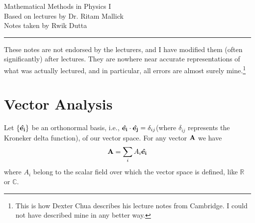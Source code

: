 \documentclass[10pt, a4paper]{extarticle}
\theoremstyle{definition}
\begin{document}
\begin{center}
	\fontsize{25}{60}\selectfont Mathematical Methods in Physics I \\
	\large Based on lectures by Dr. Ritam Mallick\\
	Notes taken by Rwik Dutta
\end{center}
\hrule
\begin{center}
	These notes are not endorsed by the lecturers, and I have modified them (often
	significantly) after lectures. They are nowhere near accurate representations of what
	was actually lectured, and in particular, all errors are almost surely mine.\footnote[1]{This is how Dexter Chua describes his lecture notes from Cambridge. I could not have described mine in any better way.}
\end{center}
\tableofcontents

\newpage

\section{Vector Analysis}
Let $\{\vu{e_i}\}$ be an orthonormal basis, i.e., $\vu{e_i}\cdot\vu{e_j}=\delta_{ij}$(where $\delta_{ij}$ represents the Kroneker delta function), of our vector space. For any vector $\vb{A}$ we have
\[\vb{A}=\sum_{i}A_i\vu{e_i}\]
where $A_i$ belong to the scalar field over which the vector space is defined, like $\mathbb{R}$ or $\mathbb{C}$.
\end{document}
